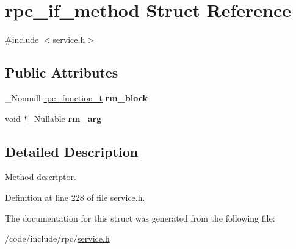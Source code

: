 \hypertarget{structrpc__if__method}{}\section{rpc\+\_\+if\+\_\+method Struct Reference}
\label{structrpc__if__method}


{\ttfamily \#include $<$service.\+h$>$}

\subsection*{Public Attributes}
\begin{DoxyCompactItemize}
\item 
\+\_\+\+Nonnull \hyperlink{service_8h_ae49a22468cfcd4adfa558078e9e4e312}{rpc\+\_\+function\+\_\+t} {\bfseries rm\+\_\+block}\hypertarget{structrpc__if__method_a5db192112740ed1adb36f74ff7c92a80}{}\label{structrpc__if__method_a5db192112740ed1adb36f74ff7c92a80}

\item 
void $\ast$\+\_\+\+Nullable {\bfseries rm\+\_\+arg}\hypertarget{structrpc__if__method_a85a2f339a726ef4afb885cbf157c0998}{}\label{structrpc__if__method_a85a2f339a726ef4afb885cbf157c0998}

\end{DoxyCompactItemize}


\subsection{Detailed Description}
Method descriptor. 

Definition at line 228 of file service.\+h.



The documentation for this struct was generated from the following file\+:\begin{DoxyCompactItemize}
\item 
/code/include/rpc/\hyperlink{service_8h}{service.\+h}\end{DoxyCompactItemize}

